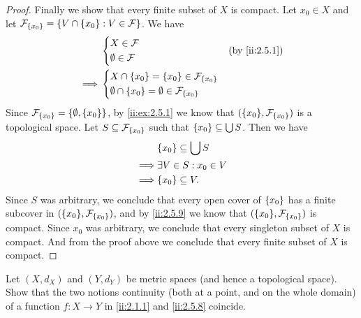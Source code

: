 \begin{proof}
  Finally we show that every finite subset of \(X\) is compact.
  Let \(x_0 \in X\) and let \(\mathcal{F}_{\left\lbrace x_0\right\rbrace} = \left\lbrace V \cap \left\lbrace x_0\right\rbrace : V \in \mathcal{F}\right\rbrace\).
  We have
  \begin{align*}
             & \begin{dcases}
                 X \in \mathcal{F} \\
                 \emptyset \in \mathcal{F}
               \end{dcases}                                        &  & \by{ii:2.5.1} \\
    \implies & \begin{dcases}
                 X \cap \set{x_0} = \set{x_0} \in \mathcal{F}_{\set{x_0}} \\
                 \emptyset \cap \set{x_0} = \emptyset \in \mathcal{F}_{\set{x_0}}
               \end{dcases}
  \end{align*}
  Since \(\mathcal{F}_{\left\lbrace x_0\right\rbrace} = \left\lbrace\emptyset, \left\lbrace x_0\right\rbrace\right\rbrace\), by \cref{ii:ex:2.5.1} we know that \((\set{x_0}, \mathcal{F}_{\set{x_0}})\) is a topological space.
  Let \(S \subseteq \mathcal{F}_{\left\lbrace x_0\right\rbrace}\) such that \(\left\lbrace x_0\right\rbrace \subseteq \bigcup S\).
  Then we have
  \begin{align*}
             & \set{x_0} \subseteq \bigcup S \\
    \implies & \exists V \in S : x_0 \in V   \\
    \implies & \set{x_0} \subseteq V.
  \end{align*}
  Since \(S\) was arbitrary, we conclude that every open cover of \(\left\lbrace x_0\right\rbrace\) has a finite subcover in \((\set{x_0}, \mathcal{F}_{\set{x_0}})\), and by \cref{ii:2.5.9} we know that \((\set{x_0}, \mathcal{F}_{\set{x_0}})\) is compact.
  Since \(x_0\) was arbitrary, we conclude that every singleton subset of \(X\) is compact.
  And from the proof above we conclude that every finite subset of \(X\) is compact.
\end{proof}

\begin{ex}\label{ii:ex:2.5.15}
  Let \((X, d_X)\) and \((Y, d_Y)\) be metric spaces (and hence a topological space).
  Show that the two notions continuity (both at a point, and on the whole domain) of a function \(f : X \to Y\) in \cref{ii:2.1.1} and \cref{ii:2.5.8} coincide.
\end{ex}


